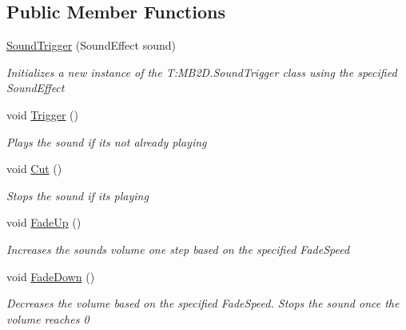 \subsection*{Public Member Functions}
\begin{DoxyCompactItemize}
\item 
\hyperlink{class_m_b2_d_1_1_sound_trigger_ae52791ea1d0f84f11dac81a8e7f34d64}{Sound\+Trigger} (Sound\+Effect sound)
\begin{DoxyCompactList}\small\item\em Initializes a new instance of the T\+:\+M\+B2\+D.\+Sound\+Trigger class using the specified Sound\+Effect \end{DoxyCompactList}\item 
void \hyperlink{class_m_b2_d_1_1_sound_trigger_a1387225550eb222ebbf70a8e097907a3}{Trigger} ()
\begin{DoxyCompactList}\small\item\em Plays the sound if it\textquotesingle{}s not already playing \end{DoxyCompactList}\item 
void \hyperlink{class_m_b2_d_1_1_sound_trigger_ae8846b39ac8469f479f8d64cbec25a11}{Cut} ()
\begin{DoxyCompactList}\small\item\em Stops the sound if it\textquotesingle{}s playing \end{DoxyCompactList}\item 
void \hyperlink{class_m_b2_d_1_1_sound_trigger_a677d10464891b21b44da3811430d5bea}{Fade\+Up} ()
\begin{DoxyCompactList}\small\item\em Increases the sounds volume one step based on the specified Fade\+Speed \end{DoxyCompactList}\item 
void \hyperlink{class_m_b2_d_1_1_sound_trigger_aca40e191ef7b6cd594d43bb36ae787e9}{Fade\+Down} ()
\begin{DoxyCompactList}\small\item\em Decreases the volume based on the specified Fade\+Speed. Stops the sound once the volume reaches 0 \end{DoxyCompactList}\end{DoxyCompactItemize}
